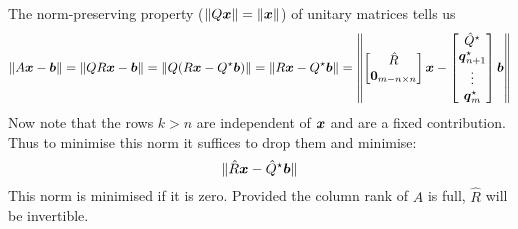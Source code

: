 \begin{example}
The norm-preserving property ($\|Q\bm{{\mbox{\boldmath$x$\unboldmath}}}\| = \|\bm{{\mbox{\boldmath$x$\unboldmath}}}\|$) of unitary matrices tells us
\[
\| A \bm{{\mbox{\boldmath$x$\unboldmath}}} - \bm{{\mbox{\boldmath$b$\unboldmath}}} \| = \| Q R \bm{{\mbox{\boldmath$x$\unboldmath}}} - \bm{{\mbox{\boldmath$b$\unboldmath}}} \| = \| Q (R \bm{{\mbox{\boldmath$x$\unboldmath}}} - Q^\star \bm{{\mbox{\boldmath$b$\unboldmath}}}) \| = \| R \bm{{\mbox{\boldmath$x$\unboldmath}}} - Q^\star \bm{{\mbox{\boldmath$b$\unboldmath}}} \| = \left \| 
\begin{bmatrix} \hat R \\ \bm{{\mbox{\boldmath$0$\unboldmath}}}_{m-n \times n} \end{bmatrix} \bm{{\mbox{\boldmath$x$\unboldmath}}} - \begin{bmatrix} \hat Q^\star \\ \bm{{\mbox{\boldmath$q$\unboldmath}}}_{n+1}^\star \\ \vdots \\ \bm{{\mbox{\boldmath$q$\unboldmath}}}_m^\star \end{bmatrix}     \bm{{\mbox{\boldmath$b$\unboldmath}}} \right \|
\]
Now note that the rows $k > n$ are independent of $\bm{{\mbox{\boldmath$x$\unboldmath}}}$ and are a fixed contribution. Thus to minimise this norm it suffices to drop them and minimise:
\[
\| \hat R \bm{{\mbox{\boldmath$x$\unboldmath}}} - \hat Q^\star \bm{{\mbox{\boldmath$b$\unboldmath}}} \|
\]
This norm is minimised if it is zero. Provided the column rank of $A$ is full, $\hat R$ will be invertible.

\end{example}



